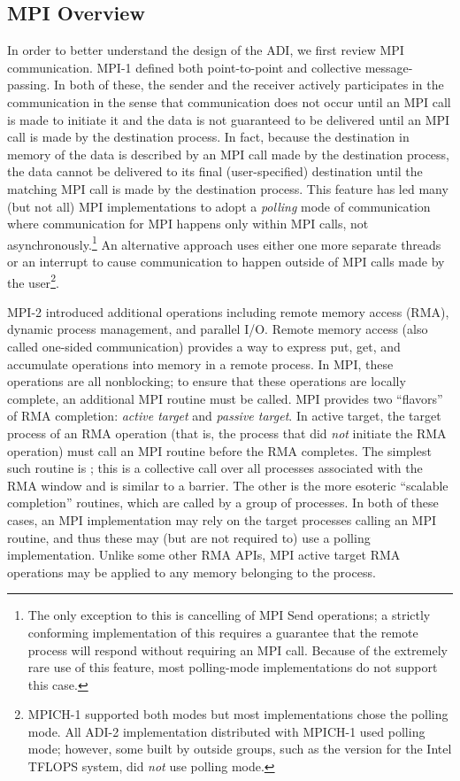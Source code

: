 \subsection{MPI Overview}
In order to better understand the design of the ADI, we first review
MPI communication.  MPI-1 defined both point-to-point and collective
message-passing.  In both of these, the sender and the receiver
actively participates in the communication in the sense that
communication does not occur until an MPI call is made to initiate it
and the data is not guaranteed to be delivered until an MPI call is
made by the destination process.  In fact, because the destination in memory of
the data is described by an MPI call made by the destination process, the
data cannot be delivered to its final (user-specified) destination
until the matching MPI call is made by the destination process.  This feature
has led many (but not all) MPI implementations to adopt a
\emph{polling} mode of communication where communication for MPI
happens only within MPI calls, not asynchronously.\footnote{The only
  exception to this is cancelling of MPI Send operations; a strictly
  conforming implementation of this requires a guarantee that the
  remote process will respond without requiring an MPI call.  Because
  of the extremely rare use of this feature, most polling-mode
  implementations do not support this case.} An alternative
approach uses either one more separate threads or an interrupt to
cause communication to happen outside of MPI calls made by the
user\footnote{MPICH-1 supported both modes but most implementations chose the
  polling mode.  All ADI-2 implementation distributed with MPICH-1 used
  polling mode; however, some built by outside groups, such as the version for the Intel TFLOPS system, did \emph{not} use polling mode.}.

MPI-2 introduced additional operations including remote memory access (RMA),
dynamic process management, and parallel I/O.  Remote memory
access (also called one-sided communication) provides a way to express
put, get, and accumulate operations into memory in a remote process.
In MPI, these operations are all nonblocking; to ensure that these
operations are locally complete, an additional MPI routine must be
called.  MPI provides two ``flavors'' of RMA completion: \emph{active
target}
and \emph{passive target}.  In active target,
the target process of an 
RMA operation (that is, the process that did \emph{not} initiate the
RMA operation) must call an MPI routine before the RMA completes.  The
simplest such routine is ; this is a collective call over
all 
processes associated with the RMA window and is similar to a barrier.
The other is the more esoteric ``scalable completion'' routines, which
are called by a group of processes.  In both of these cases, an MPI
implementation may rely on the target processes calling an MPI
routine, and thus these may (but are not required to) use a polling
implementation.   Unlike some other RMA APIs, MPI active target
RMA operations may be applied to any memory belonging to the process.

